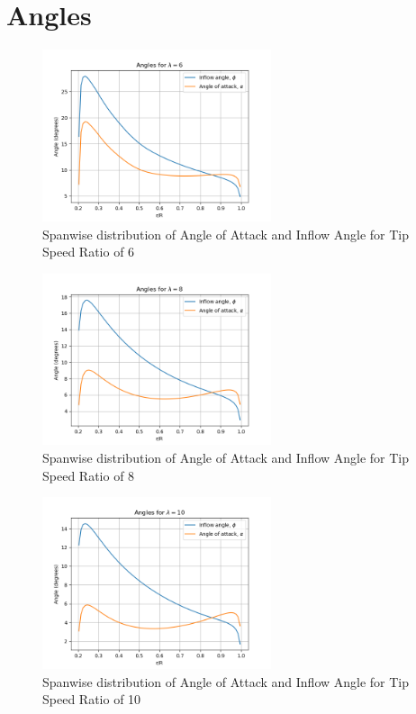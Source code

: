 \section{Angles}
\begin{figure}[H]
    \centering
    \includegraphics[width=0.6\textwidth]{Figures/alpha_phi_6.png}
    \caption{Spanwise distribution of Angle of Attack and Inflow Angle for Tip Speed Ratio of 6}
    \label{fig:spanwise distribution of angle of attack and inflow angle - lambda 6}
\end{figure}
\begin{figure}[H]
    \centering
    \includegraphics[width=0.6\textwidth]{Figures/alfa_phi_8.png}
    \caption{Spanwise distribution of Angle of Attack and Inflow Angle for Tip Speed Ratio of 8}
    \label{fig:spanwise distribution of angle of attack and inflow angle - lambda 8}
\end{figure}
\begin{figure}[H]
    \centering
    \includegraphics[width=0.6\textwidth]{Figures/alfa_phi_10.png}
    \caption{Spanwise distribution of Angle of Attack and Inflow Angle for Tip Speed Ratio of 10}
    \label{fig:spanwise distribution of angle of attack and inflow angle - lambda 10}
\end{figure}

